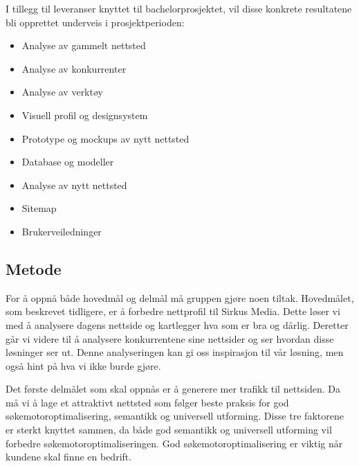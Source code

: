 
I tillegg til leveranser knyttet til bachelorprosjektet, vil disse konkrete resultatene bli opprettet underveis i prosjektperioden:
\begin{itemize}
\item Analyse av gammelt nettsted
\item Analyse av konkurrenter
\item Analyse av verktøy
\item Visuell profil og designsystem
\item Prototype og mockups av nytt nettsted
\item Database og modeller
\item Analyse av nytt nettsted
\item Sitemap
\item Brukerveiledninger
\end{itemize}

\subsection{Metode}
\label{sec:metode}
For å oppnå både hovedmål og delmål må gruppen gjøre noen tiltak. Hovedmålet, som beskrevet tidligere, er å forbedre nettprofil til Sirkus Media. Dette løser vi med å analysere dagens nettside og kartlegger hva som er bra og dårlig. Deretter går vi videre til å analysere konkurrentene sine nettsider og ser hvordan disse løsninger ser ut. Denne analyseringen kan gi oss inspirasjon til vår løsning, men også hint på hva vi ikke burde gjøre.

Det første delmålet som skal oppnås er å generere mer trafikk til nettsiden. Da må vi å lage et attraktivt nettsted som følger beste praksis for god søkemotoroptimalisering, semantikk og universell utforming. Disse tre faktorene er sterkt knyttet sammen, da både god semantikk og universell utforming vil forbedre søkemotoroptimaliseringen. God søkemotoroptimalisering er viktig når kundene skal finne en bedrift.

